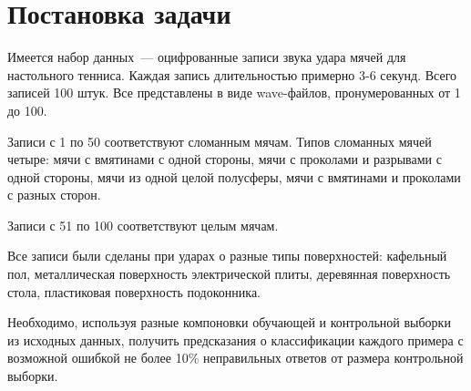 \section{Постановка задачи}
	Имеется набор данных~--- оцифрованные записи звука удара мячей для настольного тенниса.
	Каждая запись длительностью примерно 3-6 секунд. Всего записей 100 штук.
	Все представлены в виде wave-файлов, пронумерованных от 1 до 100.

	Записи с 1 по 50 соответствуют сломанным мячам. Типов сломанных мячей четыре: мячи с вмятинами с одной стороны,
	мячи с проколами и разрывами с одной стороны, мячи из одной целой полусферы, мячи с вмятинами и проколами с разных сторон.

	Записи с 51 по 100 соответствуют целым мячам.
	
	Все записи были сделаны при ударах о разные типы поверхностей: кафельный пол, металлическая поверхность электрической плиты,
	деревянная поверхность стола, пластиковая поверхность подоконника.

	Необходимо, используя разные компоновки обучающей и контрольной выборки из исходных данных, получить предсказания о классификации
	каждого примера с возможной ошибкой не более 10\% неправильных ответов от размера контрольной выборки.